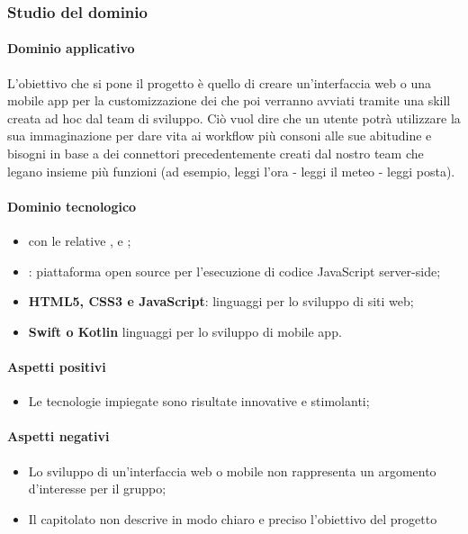 	\subsubsection{Studio del dominio}
	
	\paragraph{Dominio applicativo} \Spazio
     L’obiettivo che si pone il progetto è quello di creare un’interfaccia web o una mobile app per la customizzazione dei  che poi verranno avviati tramite una skill creata ad hoc dal team di sviluppo.
     Ciò vuol dire che un utente potrà utilizzare la sua immaginazione per dare vita ai workflow più consoni alle sue abitudine e bisogni in base a dei connettori precedentemente creati dal nostro team che legano insieme più funzioni (ad esempio, leggi l'ora - leggi il meteo - leggi posta).
	\paragraph{Dominio tecnologico}
	\begin{itemize}
		\item {\textbf{} con le relative ,  e };
		\item  \textbf{}: piattaforma open source per l'esecuzione di codice JavaScript server-side;
		\item \textbf{HTML5, CSS3 e JavaScript}: linguaggi per lo sviluppo di siti web;
		\item  \textbf{Swift o Kotlin} linguaggi per lo sviluppo di mobile app.
	\end{itemize}
	\paragraph{Aspetti positivi}
	\begin{itemize}
	\item {Le tecnologie impiegate sono risultate innovative e stimolanti;}
	\end{itemize}
	\paragraph{Aspetti negativi}
	\begin{itemize}
		\item Lo sviluppo di un'interfaccia web o mobile non rappresenta un argomento d'interesse per il gruppo;
		\item Il capitolato non descrive in modo chiaro e preciso l'obiettivo del progetto
	\end{itemize}
